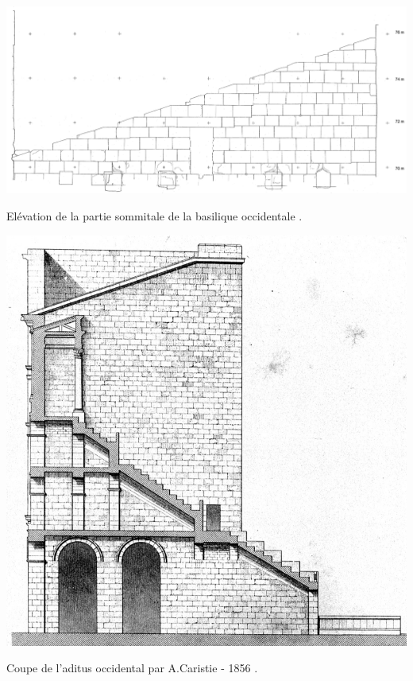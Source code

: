 \begin{figureth}
	\includegraphics[width=\linewidth]{images/grenierOcci}
	\caption[Elévation de la partie sommitale de la basilique occidentale.]{Elévation de la partie sommitale de la basilique occidentale \cite[Pl. XLVI]{orangePl}.}
	\label{grenier} 
\end{figureth}

\begin{figureth}
	\includegraphics[width=\linewidth]{images/colonneCaristie}
	\caption[Coupe de l'\gls{aditus} occidental par A.Caristie - 1856.]{Coupe de l'\gls{aditus} occidental par A.Caristie - 1856 \cite[Pl. VI]{orangePl}.}
	\label{colonneCaristie} 
\end{figureth}

